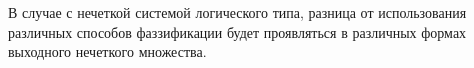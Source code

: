В случае с нечеткой системой логического типа, разница от использования различных способов фаззификации будет проявляться в различных формах выходного нечеткого множества. 

\begin{figure}[ht]
    \centering
    \begin{subfigure}[b]{\textwidth}
\end{subfigure}
\end{figure}

